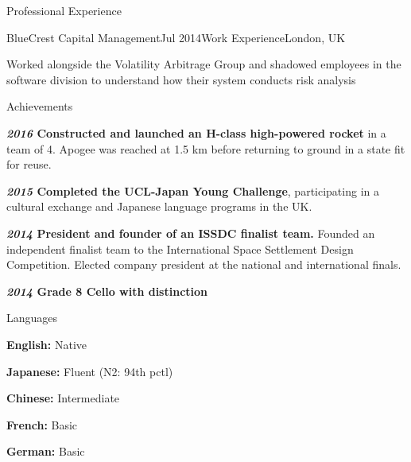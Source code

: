 \documentclass{resume} %
\begin{document}
\begin{rSection}{Professional Experience}

\begin{rSubsection}{BlueCrest Capital Management}{Jul 2014}{Work Experience}{London, UK}
    \item Worked alongside the Volatility Arbitrage Group and shadowed employees in the software division to understand how their system conducts risk analysis
\end{rSubsection}

\end{rSection}


\begin{rSection}{Achievements}
    \item \textbf{\textit{2016} Constructed and launched an H-class high-powered rocket} in a team of 4. Apogee was reached at 1.5 km before returning to ground in a state fit for reuse.
    \item \textbf{\textit{2015} Completed the UCL-Japan Young Challenge}, participating in a cultural exchange and Japanese language programs in the UK.
    \item \textbf{\textit{2014} President and founder of an ISSDC finalist team.} Founded an independent finalist team to the International Space Settlement Design Competition. Elected company president at the national and international finals.
    \item \textbf{\textit{2014} Grade 8 Cello with distinction}
\end{rSection}



\begin{rSection}{Languages}
	\item \textbf{English:} Native
	\item \textbf{Japanese:} Fluent (N2: 94th pctl)
	\item \textbf{Chinese:} Intermediate
	\item \textbf{French:} Basic
	\item \textbf{German:} Basic
\end{rSection}
\end{document}
